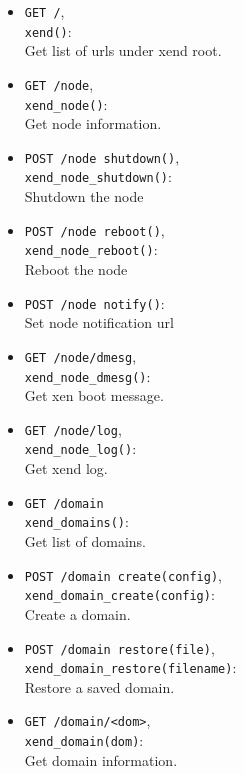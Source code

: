 \documentclass[11pt,twoside,final,openright]{report}
\begin{document}
\begin{itemize}
\item {\tt GET /},\\
  {\tt xend()}:\\
  Get list of urls under xend root.

\item {\tt GET /node},\\
  {\tt xend\_node()}:\\
  Get node information.

\item {\tt POST /node shutdown()},\\
  {\tt xend\_node\_shutdown()}:\\
  Shutdown the node

\item {\tt POST /node reboot()},\\
  {\tt xend\_node\_reboot()}:\\
  Reboot the node

\item {\tt POST /node notify()}:\\
  Set node notification url
  
\item {\tt GET /node/dmesg},\\
  {\tt xend\_node\_dmesg()}:\\
  Get xen boot message.

\item {\tt GET /node/log},\\
  {\tt xend\_node\_log()}:\\
  Get xend log.

\item {\tt GET /domain}\\
  {\tt xend\_domains()}:\\
  Get list of domains.

\item {\tt POST /domain create(config)},\\
  {\tt xend\_domain\_create(config)}:\\
  Create a domain.

\item {\tt POST /domain restore(file)},\\
  {\tt xend\_domain\_restore(filename)}:\\
  Restore a saved domain.

\item {\tt GET /domain/<dom>},\\
  {\tt xend\_domain(dom)}:\\
  Get domain information.


\end{itemize}
\end{document}
